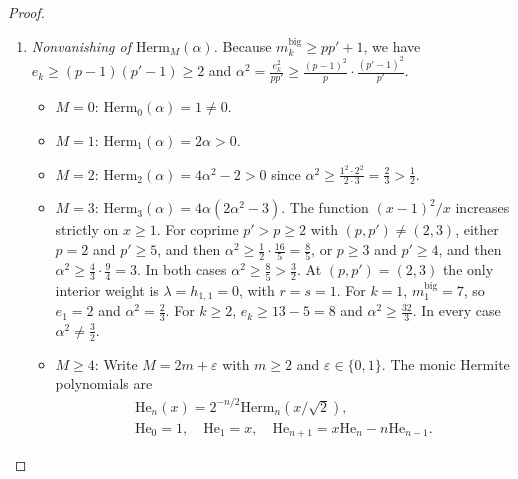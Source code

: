 \documentclass[twoside,10pt]{article}
\numberwithin{equation}{section}
\theoremstyle{slbody}
\theoremstyle{definition}
\theoremstyle{remark}
\begin{document}
\begin{proof}
\begin{enumerate}
\[   =\exp\bigl(-2\alpha vq-v^2q^2+vO(q^3)+v^2O(q^4)\bigr).
  \]
  In the logarithm of the right-hand side, the monomials \(-2\alpha vq\) and
  \(-v^2q^2\) have equal degree in \(v\) and in \(q\).  The remaining
  \(v\)-independent factor is \(1+O(q)\).  Every other monomial \(v^aq^b\) has
  \(a<b\).  Thus
  \(f(v):=H_M(c_\star,\mu,\mu,0,\Delta_3(v),\Delta_4(v))\) is a polynomial in
  \(v\) of degree at most \(M\).  Let \(\mathrm{Herm}_M(x)\) denote the \(M\)-th
  physicist's Hermite polynomial, so that
  \(\exp(2x\xi-\xi^2)=\sum_{n\geq0}\mathrm{Herm}_n(x)\xi^n/n!\).  The \([v^M]\) coefficient of \(f\)
  is
  \[
   [v^M]f(v)
   =16^{-M}[\xi^M]\exp(-2\alpha\xi-\xi^2)
   =\frac{(-1)^M}{16^M M!}\mathrm{Herm}_M(\alpha).
  \]
\item \emph{Nonvanishing of \(\mathrm{Herm}_M(\alpha)\).}  Because
  \(m^{\mathrm{big}}_k\geq pp'+1\), we have
  \(e_k\geq(p-1)(p'-1)\geq2\) and
  \(\alpha^2=\frac{e_k^2}{pp'}\geq\frac{(p-1)^2}{p}\cdot\frac{(p'-1)^2}{p'}\).
  \begin{itemize}\setlength{\itemsep}{1pt}
  \item \(M=0\): \(\mathrm{Herm}_0(\alpha)=1\neq0\).
  \item \(M=1\): \(\mathrm{Herm}_1(\alpha)=2\alpha>0\).
  \item \(M=2\): \(\mathrm{Herm}_2(\alpha)=4\alpha^2-2>0\) since
    \(\alpha^2\geq\frac{1^2\cdot 2^2}{2\cdot 3}=\frac23>\frac12\).
  \item \(M=3\): \(\mathrm{Herm}_3(\alpha)=4\alpha(2\alpha^2-3)\).  The function
    \((x-1)^2/x\) increases strictly on \(x\geq1\).  For coprime \(p'>p\geq2\)
    with \((p,p')\neq(2,3)\), either \(p=2\) and \(p'\geq5\), and then
    \(\alpha^2\geq\frac12\cdot\frac{16}{5}=\frac85\), or \(p\geq3\) and
    \(p'\geq4\), and then \(\alpha^2\geq\frac43\cdot\frac94=3\).  In both cases
    \(\alpha^2\geq\frac85>\frac32\).  At
    \((p,p')=(2,3)\) the only interior weight is \(\lambda=h_{1,1}=0\), with
    \(r=s=1\).  For \(k=1\), \(m^{\mathrm{big}}_1=7\), so \(e_1=2\) and
    \(\alpha^2=\frac23\).  For \(k\geq2\), \(e_k\geq13-5=8\) and
    \(\alpha^2\geq\frac{32}{3}\).  In every case \(\alpha^2\neq\frac32\).
  \item \(M\geq4\): Write \(M=2m+\varepsilon\) with \(m\geq2\) and
    \(\varepsilon\in\{0,1\}\).  The monic Hermite polynomials are
    \begin{gather*}
     \mathrm{He}_n(x)=2^{-n/2}\mathrm{Herm}_n(x/\sqrt2),\\
     \mathrm{He}_0=1,\quad \mathrm{He}_1=x,\quad
     \mathrm{He}_{n+1}=x\mathrm{He}_n-n\mathrm{He}_{n-1}.

\end{gather*}
\end{itemize}
\end{enumerate}
\end{proof}
\end{document}
